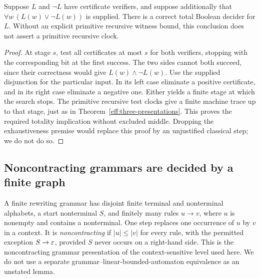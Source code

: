 \begin{proposition}
\label{eff:two-recognizers}
Suppose $L$ and $\neg L$ have certificate verifiers, and suppose additionally
that $\forall w\,(L(w)\vee\neg L(w))$ is supplied.  There is a correct total
Boolean decider for $L$.  Without an explicit primitive recursive witness
bound, this conclusion does not assert a primitive recursive clock.
\end{proposition}
\begin{proof}
At stage $s$, test all certificates at most $s$ for both verifiers, stopping
with the corresponding bit at the first success.  The two sides cannot
both succeed, since their correctness would give $L(w)\wedge\neg L(w)$.
Use the supplied disjunction for the particular input.  In its left case
eliminate a positive certificate, and in its right case eliminate a
negative one.  Either yields a finite stage at which the search stops.
The primitive recursive test clocks give a finite machine trace up to that
stage, just as in Theorem~\ref{eff:three-presentations}.  This proves the
required totality implication without excluded middle.  Dropping the
exhaustiveness premise would replace this proof by an unjustified
classical step; we do not do so.
\end{proof}

\subsection{Noncontracting grammars are decided by a finite graph}

A finite rewriting grammar has disjoint finite terminal and nonterminal
alphabets, a start nonterminal $S$, and finitely many rules $u\to v$, where
$u$ is nonempty and contains a nonterminal.  One step replaces one occurrence
of $u$ by $v$ in a context.  It is \emph{noncontracting} if $|u|\leq |v|$
for every rule, with the permitted exception $S\to\varepsilon$, provided $S$
never occurs on a right-hand side.  This is the noncontracting grammar
presentation of the context-sensitive level used here.  We do not use a
separate grammar--linear-bounded-automaton equivalence as an unstated lemma.

